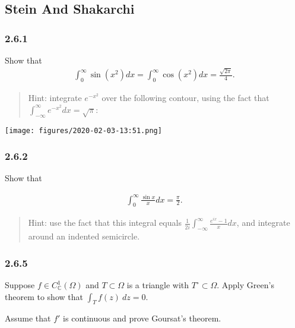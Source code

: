 \hypertarget{stein-and-shakarchi}{%
\subsection{Stein And Shakarchi}\label{stein-and-shakarchi}}

\hypertarget{section-32}{%
\subsubsection{2.6.1}\label{section-32}}

Show that
\begin{align*}
\int_{0}^{\infty} \sin \left(x^{2}\right) d x=\int_{0}^{\infty} \cos \left(x^{2}\right) d x=\frac{\sqrt{2 \pi}}{4}
.\end{align*}

\begin{quote}
Hint: integrate \(e^{-x^2}\) over the following contour, using the fact
that \(\int_{-\infty}^{\infty} e^{-x^{2}} d x=\sqrt{\pi}\):
\end{quote}

\texttt{[image: figures/2020-02-03-13:51.png]}\\

\hypertarget{section-33}{%
\subsubsection{2.6.2}\label{section-33}}

Show that

\begin{align*}
\int_{0}^{\infty} \frac{\sin x}{x} d x=\frac{\pi}{2}
.\end{align*}

\begin{quote}
Hint: use the fact that this integral equals
\(\frac{1}{2 i} \int_{-\infty}^{\infty} \frac{e^{i x}-1}{x} d x\), and
integrate around an indented semicircle.
\end{quote}

\hypertarget{section-34}{%
\subsubsection{2.6.5}\label{section-34}}

Suppose \(f\in C_{\mathbb{C}}^1(\Omega)\) and \(T\subset \Omega\) is a
triangle with \(T^\circ \subset \Omega\). Apply Green's theorem to show
that \(\int_T f(z) ~dz = 0\).

Assume that \(f'\) is continuous and prove Goursat's theorem.

